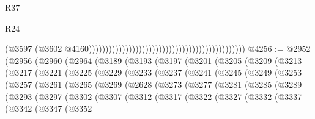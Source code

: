 \begin{lexlean}{R37}
\begin{lexlean}{R24}
\begin{coremodule}
{{{{{{{{{{{{{{{{{{{{{{{{{{{{{{{{{{{{{{{{{{{{{{{{{{{{{{{{{{{{{{{{{{{{{{{{{{{{{{{{{{{{{{{{{{{{{{{{{{{{{{{{{{{{{{{{{{{{{{{{{{{{{{{{{{{{{{{{{{{{{{{{{{{{{{{{{{{{{{{{{{{{{{{{{{{{{{{{{{{{{{{{{                                                                                              (@3597
                                                                                                (@3602
                                                                                                  @4160)))))))))))))))))))))))))))))))))))))))))))))))
@4256 := @2952
    (@2956
      (@2960
        (@2964
          (@3189
            (@3193
              (@3197
                (@3201
                  (@3205
                    (@3209
                      (@3213
                        (@3217
                          (@3221
                            (@3225
                              (@3229
                                (@3233
                                  (@3237
                                    (@3241
                                      (@3245
                                        (@3249
                                          (@3253
                                            (@3257
                                              (@3261
                                                (@3265
                                                  (@3269
                                                    (@2628
                                                      (@3273
                                                        (@3277
                                                          (@3281
                                                            (@3285
                                                              (@3289
                                                                (@3293
                                                                  (@3297
                                                                    (@3302
                                                                      (@3307
                                                                        (@3312
                                                                          (@3317
                                                                            (@3322
                                                                              (@3327
                                                                                (@3332
                                                                                  (@3337
                                                                                    (@3342
                                                                                      (@3347
                                                                                        (@3352
}}}}}}}}}}}}}}}}}}}}}}}}}}}}}}}}}}}}}}}}}}}}}}}}}}}}}}}}}}}}}}}}}}}}}}}}}}}}}}}}}}}}}}}}}}}}}}}}}}}}}}}}}}}}}}}}}}}}}}}}}}}}}}}}}}}}}}}}}}}}}}}}}}}}}}}}}}}}}}}}}}}}}}}}}}}}}}}}}}}}}}}}}
\end{coremodule}
\end{lexlean}
\end{lexlean}
